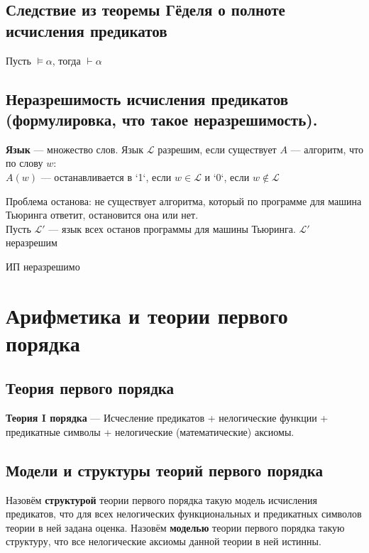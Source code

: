 \documentclass[english]{article}
\begin{document}
\subsection{Следствие из теоремы Гёделя о полноте исчисления предикатов}
\label{sec:org4604328}
\begin{corollary}
	Пусть \(\vDash \alpha\), тогда \(\vdash \alpha\)
	\label{orga5faebc}
\end{corollary}
\subsection{Неразрешимость исчисления предикатов (формулировка, что такое неразрешимость).}
\label{sec:org3c004a9}
\begin{definition}
	\textbf{Язык} --- множество слов. Язык \(\mathcal{L}\) разрешим, если существует \(A\) --- алгоритм, что по слову \(w\): \\
	\(A(w)\) --- останавливается в `1`, если \(w \in \mathcal{L}\) и `0`, если \(w \not\in \mathcal{L}\)
	\label{org230480c}
\end{definition}
\begin{remark}
	Проблема останова: не существует алгоритма, который по программе для машина Тьюринга ответит, остановится она или нет. \\
	Пусть \(\mathcal{L}'\) --- язык всех останов программы для машины Тьюринга. \(\mathcal{L}'\) неразрешим
	\label{orgb656258}
\end{remark}
\begin{theorem}
	ИП неразрешимо
	\label{org07d2421}
\end{theorem}
\section{Арифметика и теории первого порядка}
\label{sec:org4f52afc}
\subsection{Теория первого порядка}
\label{sec:orge47421f}
\begin{definition}
	\textbf{Теория I порядка} --- Исчесление предикатов + нелогические функции + предикатные символы + нелогические (математические) аксиомы.
	\label{org21ccd35}
\end{definition}
\subsection{Модели и структуры теорий первого порядка}
\label{sec:org7aad238}
Назовём \textbf{структурой} теории первого порядка такую модель исчисления предикатов, что для всех нелогических
функциональных и предикатных символов теории в ней задана оценка.
Назовём \textbf{моделью} теории первого порядка такую структуру, что все нелогические аксиомы данной теории в ней
истинны.
\end{document}
